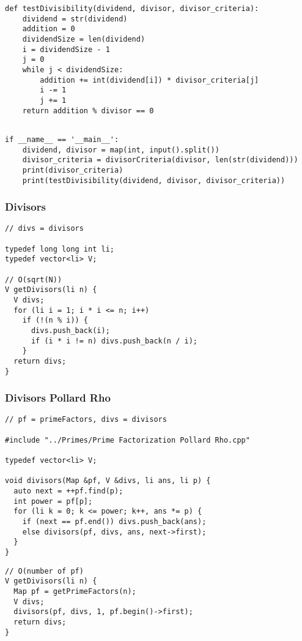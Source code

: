 \documentclass[twoside]{article}
\begin{document}
\begin{multicols*}{2}
\begin{verbatim}
\end{verbatim}
\vspace{-12pt}
\begin{verbatim}
def testDivisibility(dividend, divisor, divisor_criteria):
    dividend = str(dividend)
    addition = 0
    dividendSize = len(dividend)
    i = dividendSize - 1
    j = 0
    while j < dividendSize:
        addition += int(dividend[i]) * divisor_criteria[j]
        i -= 1
        j += 1
    return addition % divisor == 0


\end{verbatim}
\vspace{-12pt}
\begin{verbatim}
if __name__ == '__main__':
    dividend, divisor = map(int, input().split())
    divisor_criteria = divisorCriteria(divisor, len(str(dividend)))
    print(divisor_criteria)
    print(testDivisibility(dividend, divisor, divisor_criteria))

\end{verbatim}

\subsubsectionfont{\large\bfseries\sffamily\underline}
\subsubsection*{Divisors}
\begin{verbatim}
// divs = divisors

typedef long long int li;
typedef vector<li> V;

// O(sqrt(N))
V getDivisors(li n) {
  V divs;
  for (li i = 1; i * i <= n; i++)
    if (!(n % i)) {
      divs.push_back(i);
      if (i * i != n) divs.push_back(n / i);
    }
  return divs;
}
\end{verbatim}

\subsubsectionfont{\large\bfseries\sffamily\underline}
\subsubsection*{Divisors Pollard Rho}
\begin{verbatim}
// pf = primeFactors, divs = divisors

#include "../Primes/Prime Factorization Pollard Rho.cpp"

typedef vector<li> V;

void divisors(Map &pf, V &divs, li ans, li p) {
  auto next = ++pf.find(p);
  int power = pf[p];
  for (li k = 0; k <= power; k++, ans *= p) {
    if (next == pf.end()) divs.push_back(ans);
    else divisors(pf, divs, ans, next->first);
  }
}
\end{verbatim}
\vspace{-12pt}
\begin{verbatim}
// O(number of pf)
V getDivisors(li n) {
  Map pf = getPrimeFactors(n);
  V divs;
  divisors(pf, divs, 1, pf.begin()->first);
  return divs;
}
\end{verbatim}


\end{multicols*}
\end{document}
